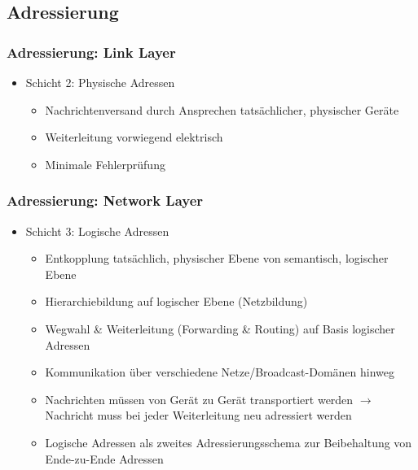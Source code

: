 \documentclass[xcolor=dvipsnames, aspectratio=169]{beamer}
\begin{document}
\subsection{Adressierung}
\begin{frame}
	\frametitle{Adressierung: Link Layer}
	\begin{itemize}
		\item Schicht 2: Physische Adressen
		\begin{itemize}
			\item Nachrichtenversand durch Ansprechen tatsächlicher, physischer Geräte
			\item Weiterleitung vorwiegend elektrisch 
			\item Minimale Fehlerprüfung
		\end{itemize}
	\end{itemize}
\end{frame}

\begin{frame}
	\frametitle{Adressierung: Network Layer}
	\begin{itemize}
\item Schicht 3: Logische Adressen
		\begin{itemize}
			\item Entkopplung tatsächlich, physischer Ebene von semantisch, logischer Ebene
			\item Hierarchiebildung auf logischer Ebene (Netzbildung)
			\item Wegwahl \& Weiterleitung (Forwarding \& Routing) auf Basis logischer Adressen
			\item Kommunikation über verschiedene Netze/Broadcast-Domänen hinweg
			\item Nachrichten müssen von Gerät zu Gerät transportiert werden $\rightarrow$ Nachricht muss
bei jeder Weiterleitung neu adressiert werden
			\item Logische Adressen als zweites Adressierungsschema zur Beibehaltung von Ende-zu-Ende Adressen
		\end{itemize}
	\end{itemize}
\end{frame}
\end{document}
